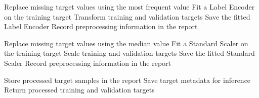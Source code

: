\begin{algorithm}[H]
\caption{Target Variable Preprocessing}
\begin{algorithmic}[1]


    \STATE Replace missing target values using the most frequent value
    \STATE Fit a Label Encoder on the training target
    \STATE Transform training and validation targets
    \STATE Save the fitted Label Encoder
    \STATE Record preprocessing information in the report


    \STATE Replace missing target values using the median value
    \STATE Fit a Standard Scaler on the training target
    \STATE Scale training and validation targets
    \STATE Save the fitted Standard Scaler
    \STATE Record preprocessing information in the report

\ENDIF

\STATE Store processed target samples in the report
\STATE Save target metadata for inference
\STATE Return processed training and validation targets

\end{algorithmic}
\end{algorithm}